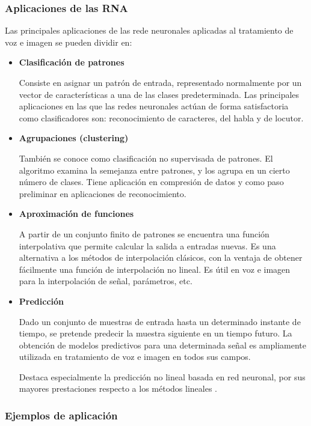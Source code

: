 		\subsubsection{Aplicaciones de las RNA}

		Las principales aplicaciones de las rede neuronales aplicadas al tratamiento de voz e imagen se pueden dividir en:
		\begin{itemize}
			\item\textbf{Clasificación de patrones}

			Consiste en asignar un patrón de entrada, representado normalmente por un vector de características a una de las clases predeterminada. Las principales aplicaciones en las que las redes neuronales actúan de forma satisfactoria como clasificadores son: reconocimiento de caracteres, del habla y de locutor.
			\item \textbf{Agrupaciones (clustering)}

			También se conoce como clasificación no supervisada de patrones. El algoritmo examina la semejanza entre patrones, y los agrupa en un cierto número de clases. Tiene aplicación en compresión de datos y como paso preliminar en aplicaciones de reconocimiento.
			\item \textbf{Aproximación de funciones}

			A partir de un conjunto finito de patrones se encuentra una función interpolativa que permite calcular la salida a entradas nuevas. Es una alternativa a los métodos de interpolación clásicos, con la ventaja de obtener fácilmente una función de interpolación no lineal. Es útil en voz e imagen para la interpolación de señal, parámetros, etc.
			\item \textbf{Predicción}

			Dado un conjunto de muestras de entrada hasta un determinado instante de tiempo, se pretende predecir la muestra siguiente en un tiempo futuro. La obtención de modelos predictivos para una determinada señal es ampliamente utilizada en tratamiento de voz e imagen en todos sus campos.

			Destaca especialmente la predicción no lineal basada en red neuronal, por sus mayores prestaciones respecto a los métodos lineales \cite{Faundez2001}.
		\end{itemize}

		\subsubsection{Ejemplos de aplicación}

